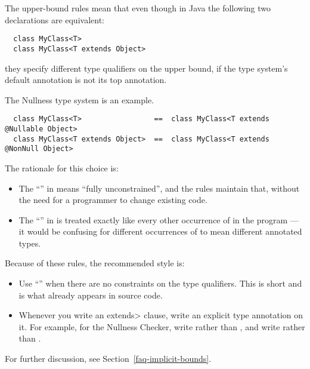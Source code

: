 The upper-bound rules mean that even though in Java the following two
declarations are equivalent:

\begin{Verbatim}
  class MyClass<T>
  class MyClass<T extends Object>
\end{Verbatim}

\noindent
they specify different type qualifiers on the upper bound,
if the type system's default annotation is not its top annotation.

The Nullness type system is an example.

\begin{Verbatim}
  class MyClass<T>                 ==  class MyClass<T extends @Nullable Object>
  class MyClass<T extends Object>  ==  class MyClass<T extends @NonNull Object>
\end{Verbatim}

The rationale for this choice is:
\begin{itemize}
\item
  The ``'' in  means ``fully unconstrained'',
  and the rules maintain that, without the need for a programmer to
  change existing code.
\item
  The ``'' in  is treated
  exactly like every other occurrence of  in the program ---
  it would be confusing for different occurrences of  to mean
  different annotated types.
\end{itemize}

Because of these rules, the recommended style is:
\begin{itemize}
\item
  Use ``'' when there are no constraints on the type qualifiers.
  This is short and is what already appears in source code.
\item
  Whenever you write an \<extends> clause, write an explicit type
  annotation on it.  For example, for the Nullness Checker, write
   rather than , and write  rather than .
\end{itemize}

For further discussion, see Section~\ref{faq-implicit-bounds}.




